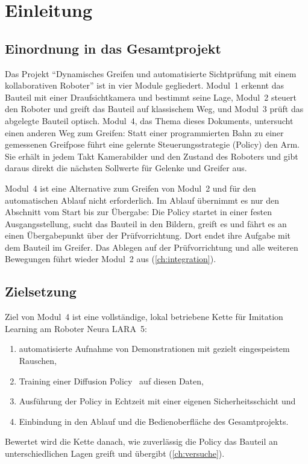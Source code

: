 \chapter{Einleitung}
\label{ch:einleitung}

\section{Einordnung in das Gesamtprojekt}
\label{sec:einordnung}

Das Projekt \enquote{Dynamisches Greifen und automatisierte Sichtprüfung mit einem
kollaborativen Roboter} ist in vier Module gegliedert. Modul~1 erkennt das Bauteil mit
einer Draufsichtkamera und bestimmt seine Lage, Modul~2 steuert den Roboter und greift das
Bauteil auf klassischem Weg, und Modul~3 prüft das abgelegte Bauteil optisch. Modul~4, das
Thema dieses Dokuments, untersucht einen anderen Weg zum Greifen: Statt einer programmierten
Bahn zu einer gemessenen Greifpose führt eine gelernte Steuerungsstrategie (Policy) den Arm.
Sie erhält in jedem Takt Kamerabilder und den Zustand des Roboters und gibt daraus direkt die
nächsten Sollwerte für Gelenke und Greifer aus.

Modul~4 ist eine Alternative zum Greifen von Modul~2 und für den automatischen Ablauf nicht
erforderlich. Im Ablauf übernimmt es nur den Abschnitt vom Start bis zur Übergabe: Die Policy
startet in einer festen Ausgangsstellung, sucht das Bauteil in den Bildern, greift es und
fährt es an einen Übergabepunkt über der Prüfvorrichtung. Dort endet ihre Aufgabe mit dem
Bauteil im Greifer. Das Ablegen auf der Prüfvorrichtung und alle weiteren Bewegungen führt
wieder Modul~2 aus (\cref{ch:integration}).

\section{Zielsetzung}
\label{sec:ziel}

Ziel von Modul~4 ist eine vollständige, lokal betriebene Kette für Imitation Learning am
Roboter Neura LARA~5:
\begin{enumerate}
  \item automatisierte Aufnahme von Demonstrationen mit gezielt eingespeistem Rauschen,
  \item Training einer Diffusion Policy~\cite{chi2024} auf diesen Daten,
  \item Ausführung der Policy in Echtzeit mit einer eigenen Sicherheitsschicht und
  \item Einbindung in den Ablauf und die Bedienoberfläche des Gesamtprojekts.
\end{enumerate}
Bewertet wird die Kette danach, wie zuverlässig die Policy das Bauteil an unterschiedlichen
Lagen greift und übergibt (\cref{ch:versuche}).

